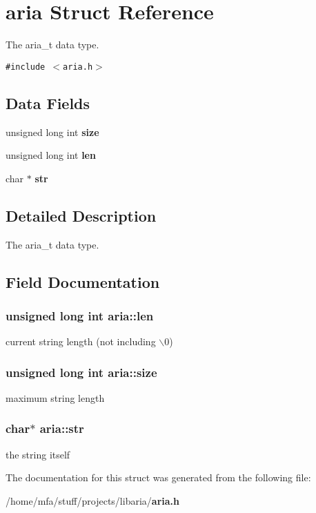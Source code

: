 \section{aria Struct Reference}
\label{structaria}
The aria\_\-t data type.  


{\tt \#include $<$aria.h$>$}

\subsection*{Data Fields}
\begin{CompactItemize}
\item 
unsigned long int \bf{size}
\item 
unsigned long int \bf{len}
\item 
char $\ast$ \bf{str}
\end{CompactItemize}


\subsection{Detailed Description}
The aria\_\-t data type. 



\subsection{Field Documentation}
\subsubsection{\setlength{\rightskip}{0pt plus 5cm}unsigned long int \bf{aria::len}}\label{structaria_f89557da7c1fc766923ee0adf1f64432}


current string length (not including $\backslash$0) 
\subsubsection{\setlength{\rightskip}{0pt plus 5cm}unsigned long int \bf{aria::size}}\label{structaria_222cb03ba34a58511d8d98a00a877717}


maximum string length 
\subsubsection{\setlength{\rightskip}{0pt plus 5cm}char$\ast$ \bf{aria::str}}\label{structaria_1537691b57f66ef2524220ba7e4bf6ae}


the string itself 

The documentation for this struct was generated from the following file:\begin{CompactItemize}
\item 
/home/mfa/stuff/projects/libaria/\bf{aria.h}\end{CompactItemize}
